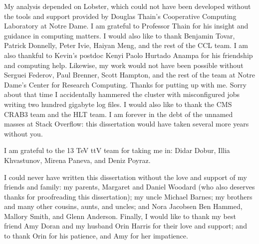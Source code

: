 \documentclass[noinfo,final,nonatbib]{nddiss2e}
\begin{document}
\begin{acknowledge}
My analysis depended on Lobster, which could not have been developed without the
tools and support provided by Douglas Thain's Cooperative Computing Laboratory
at Notre Dame. I am grateful to Professor Thain for his insight and guidance in
computing matters. I would also like to thank Benjamin Tovar, Patrick Donnelly,
Peter Ivie, Haiyan Meng, and the rest of the CCL team. I am also thankful to
Kevin's postdoc Kenyi Paolo Hurtado Anampa for his friendship and computing
help. Likewise, my work would not have been possible without Serguei Federov,
Paul Brenner, Scott Hampton, and the rest of the team at Notre Dame's Center for
Research Computing. Thanks for putting up with me. Sorry about that time I
accidentally hammered the cluster with misconfigured jobs writing two hundred
gigabyte log files. I would also like to thank the CMS CRAB3 team and the HLT
team. I am forever in the debt of the unnamed masses at Stack Overflow: this
dissertation would have taken several more years without you.

I am grateful to the 13 TeV ttV team for taking me in: Didar Dobur, Illia
Khvastunov, Mirena Paneva, and Deniz Poyraz.

I could never have written this dissertation without the love and support of my
friends and family: my parents, Margaret and Daniel Woodard (who also deserves
thanks for proofreading this dissertation); my uncle Michael Barnes; my brothers
and many other cousins, aunts, and uncles; and Nora Jacobsen Ben Hammed, Mallory
Smith, and Glenn Anderson. Finally, I would like to thank my best friend Amy
Doran and my husband Orin Harris for their love and support; and to thank Orin
for his patience, and Amy for her impatience.

\end{acknowledge}

\mainmatter









\appendix



\backmatter

% 
% 
\nocite{Ellis:2016jkw}
\singlespacing
\printbibliography[heading=bibintoc]
\end{document}
